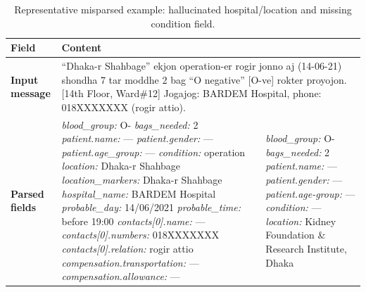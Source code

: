 \documentclass[11pt]{article}
\begin{document}
\begin{table}[t]
\centering
\small
\caption{Representative misparsed example: hallucinated hospital/location and missing condition field.}
\label{tab:misparsed-1-hospital}
\begin{tabularx}{\textwidth}{@{}p{}XX@{}}
\toprule
\textbf{Field} & \multicolumn{2}{l}{\textbf{Content}} \\
\midrule
\textbf{Input message} &
\multicolumn{2}{p{0.75\textwidth}}{``Dhaka-r Shahbage'' ekjon operation-er rogir jonno aj (14-06-21) shondha 7 tar moddhe 2 bag ``O negative'' [O-ve] rokter proyojon. [14th Floor, Ward\#12] Jogajog: BARDEM Hospital, phone: 018XXXXXXX (rogir attio).} \\
\midrule
\textbf{Parsed fields} &
{\ttfamily\footnotesize
\textit{blood\_group:} O-\newline
\textit{bags\_needed:} 2\newline
\textit{patient.name:} ---\newline
\textit{patient.gender:} ---\newline
\textit{patient.age\_group:} ---\newline
\textit{condition:} operation\newline
\textit{location:} Dhaka-r Shahbage\newline
\textit{location\_markers:} Dhaka-r Shahbage\newline
\textit{hospital\_name:} BARDEM Hospital\newline
\textit{probable\_day:} 14/06/2021\newline
\textit{probable\_time:} before 19:00\newline
\textit{contacts[0].name:} ---\newline
\textit{contacts[0].numbers:} 018XXXXXXX\newline
\textit{contacts[0].relation:} rogir attio\newline
\textit{compensation.transportation:} ---\newline
\textit{compensation.allowance:} ---
} &
{\ttfamily\footnotesize
\textit{blood\_group:} O-\newline
\textit{bags\_needed:} 2\newline
\textit{patient.name:} ---\newline
\textit{patient.gender:} ---\newline
\textit{patient.age-group:} ---\newline
\textit{condition:} ---\newline
\textit{location:} Kidney Foundation \& Research Institute, Dhaka\newline
}
\end{tabularx}
\end{table}
\end{document}
